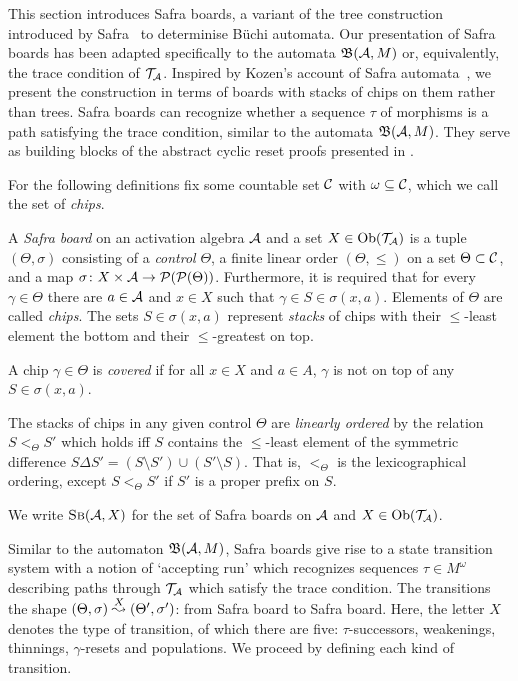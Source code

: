 This section introduces Safra boards, a variant of the tree construction
introduced by Safra~\parencite{safraComplexityOmegaAutomata1988} to determinise Büchi
automata. Our presentation of Safra boards has been adapted specifically to the
automata $\mathfrak{B}(\mathcal{A}, M)$ or, equivalently, the trace condition of $\mathcal{T}_{\mathcal{A}}$.
Inspired by Kozen's account of Safra automata~\parencite{kozenSafraConstruction2006}, we
present the construction in terms of boards with stacks of chips on them rather
than trees. Safra boards can recognize whether a
sequence $\tau$ of morphisms is a path satisfying the trace condition, similar
to the automata $\mathfrak{B}(\mathcal{A}, M)$. They serve as building blocks of the abstract
cyclic reset proofs presented in .

For the following definitions fix some
countable set $\mathcal{C}$ with $\omega \subseteq \mathcal{C}$, which we call the set of \emph{chips}.

\begin{definition}\label{def:safra-board}
  A \emph{Safra board} on an activation algebra $\mathcal{A}$ and a set $X \in \mathrm{Ob}(\mathcal{T}_{\mathcal{A}})$ is a tuple
  $(\Theta, \sigma)$ consisting of a \emph{control} $\Theta$, a finite linear order
  $(\Theta, \leq)$ on a set $\Theta \subset \mathcal{C}$, and a map $\sigma \colon X \times \mathcal{A} \to
  \mathcal{P}(\mathcal{P}(\Theta))$. Furthermore, it is required that for
  every $\gamma \in \Theta$ there are $a \in \mathcal{A}$ and $x \in X$ such that
  $\gamma \in S \in \sigma(x, a)$. 
  Elements of \( \Theta \) are called \emph{chips}.
The sets $S \in \sigma(x, a)$ represent
  \emph{stacks} of chips with their $\leq$-least element the bottom
  and their $\leq$-greatest on top.

  A chip $\gamma \in \Theta$ is
  \emph{covered} if for all $x \in X$ and $a \in A$, \( \gamma \) is not on top of any $S \in
  \sigma(x, a)$.

  The stacks of chips in any given control $\Theta$ are \emph{linearly ordered}
  by the relation $S <_\Theta S'$ which holds iff $S$ contains the $\leq$-least
  element of the symmetric difference $S \Delta S' = ( S \setminus S' ) \cup ( S'
  \setminus S )$. That is, $<_\Theta$ is the lexicographical ordering, except $S
  <_\Theta S'$ if $S'$ is a proper prefix on $S$.

  We write \emph{$\textsc{Sb}(\mathcal{A}, X)$} for the set of Safra boards on $\mathcal{A}$ and $X \in \mathrm{Ob}(\mathcal{T}_{\mathcal{A}})$.
\end{definition}

Similar to the automaton $\mathfrak{B}(\mathcal{A}, M)$, Safra boards give rise to a state
transition system with a notion of `accepting run' which recognizes sequences
$\tau \in M^\omega$ describing paths through $\mathcal{T}_{\mathcal{A}}$ which satisfy the trace
condition. The transitions the shape $(\Theta,
\sigma) \stackrel{X}{\leadsto} (\Theta', \sigma')$: from Safra board to Safra board. Here, the
letter $X$ denotes the type of transition, of which there are five:
$\tau$-successors, weakenings, thinnings, $\gamma$-resets and populations. We
proceed by defining each kind of transition.

